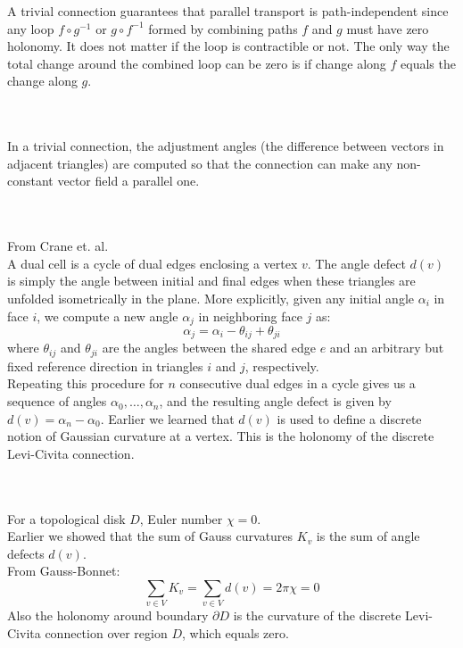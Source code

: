 \documentclass{article}
\begin{document}
A trivial connection guarantees that parallel transport is path-independent since any loop
$f \circ g^{-1}$ or $g \circ f^{-1}$ formed by combining paths $f$ and $g$ must have zero holonomy.
It does not matter if the loop is contractible or not. The only way the total change around the combined loop
can be zero is if change along $f$ equals the change along $g$.


\pagebreak
{}\\\\


In a trivial connection, the adjustment angles (the difference between vectors in adjacent triangles) are computed
so that the connection can make any non-constant vector field a parallel one.


\vspace{1.8cm}
\\\\


From Crane et. al. \\

A dual cell is a cycle of dual edges enclosing a vertex $v$. The angle defect $d(v)$ is simply the angle between
initial and final edges when these triangles are unfolded isometrically in the plane. More explicitly, given any initial
angle $\alpha_i$ in face $i$, we compute a new angle $\alpha_j$ in neighboring face $j$ as:
$$
    \alpha_j = \alpha_i - \theta_{ij} + \theta_{ji}
$$
where $\theta_{ij}$ and $\theta_{ji}$ are the angles between the shared edge $e$ and an arbitrary but fixed
reference direction in triangles $i$ and $j$, respectively. \\

Repeating this procedure for $n$ consecutive dual edges in a cycle gives us a sequence of angles
$\alpha_0, \dots, \alpha_n$, and the resulting angle defect is given by $d(v) = \alpha_n - \alpha_0$.
Earlier we learned that $d(v)$ is used to define a discrete notion of Gaussian curvature at a vertex.
This is the holonomy of the discrete Levi-Civita connection.


\vspace{1.8cm}
\\\\


For a topological disk $D$, Euler number $\chi = 0$. \\
Earlier we showed that the sum of Gauss curvatures $K_v$ is the sum of angle defects $d(v)$. \\
From Gauss-Bonnet:
$$
    \sum_{v \in V} K_v  = \sum_{v \in V} d(v) = 2\pi\chi = 0
$$
Also the holonomy around boundary $\partial D$
is the curvature of the discrete Levi-Civita connection over region $D$, which equals zero.
\end{document}
